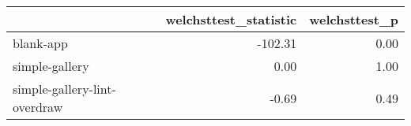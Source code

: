 \begin{tabular}{lrr}
\toprule
{} &  welchsttest\_statistic &  welchsttest\_p \\
\midrule
blank-app                    &                -102.31 &           0.00 \\
simple-gallery               &                   0.00 &           1.00 \\
simple-gallery-lint-overdraw &                  -0.69 &           0.49 \\
\bottomrule
\end{tabular}
